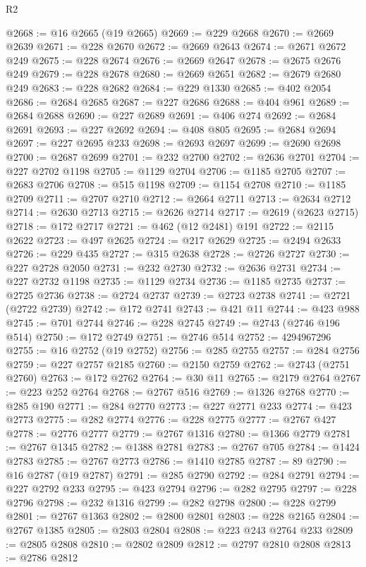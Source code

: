 \begin{lexlean}{R2}
\begin{coremodule}
@2668 := @16 @2665 (@19 @2665)
@2669 := @229 @2668
@2670 := @2669 @2639
@2671 := @228 @2670
@2672 := @2669 @2643
@2674 := @2671 @2672 @249
@2675 := @228 @2674
@2676 := @2669 @2647
@2678 := @2675 @2676 @249
@2679 := @228 @2678
@2680 := @2669 @2651
@2682 := @2679 @2680 @249
@2683 := @228 @2682
@2684 := @229 @1330
@2685 := @402 @2054
@2686 := @2684 @2685
@2687 := @227 @2686
@2688 := @404 @961
@2689 := @2684 @2688
@2690 := @227 @2689
@2691 := @406 @274
@2692 := @2684 @2691
@2693 := @227 @2692
@2694 := @408 @805
@2695 := @2684 @2694
@2697 := @227 @2695 @233
@2698 := @2693 @2697
@2699 := @2690 @2698
@2700 := @2687 @2699
@2701 := @232 @2700
@2702 := @2636 @2701
@2704 := @227 @2702 @1198
@2705 := @1129 @2704
@2706 := @1185 @2705
@2707 := @2683 @2706
@2708 := @515 @1198
@2709 := @1154 @2708
@2710 := @1185 @2709
@2711 := @2707 @2710
@2712 := @2664 @2711
@2713 := @2634 @2712
@2714 := @2630 @2713
@2715 := @2626 @2714
@2717 := @2619 (@2623 @2715)
@2718 := @172 @2717
@2721 := @462 (@12 @2481) @191
@2722 := @2115 @2622
@2723 := @497 @2625
@2724 := @217 @2629
@2725 := @2494 @2633
@2726 := @229 @435
@2727 := @315 @2638
@2728 := @2726 @2727
@2730 := @227 @2728 @2050
@2731 := @232 @2730
@2732 := @2636 @2731
@2734 := @227 @2732 @1198
@2735 := @1129 @2734
@2736 := @1185 @2735
@2737 := @2725 @2736
@2738 := @2724 @2737
@2739 := @2723 @2738
@2741 := @2721 (@2722 @2739)
@2742 := @172 @2741
@2743 := @421 @11
@2744 := @423 @988
@2745 := @701 @2744
@2746 := @228 @2745
@2749 := @2743 (@2746 @196 @514)
@2750 := @172 @2749
@2751 := @2746 @514
@2752 := 4294967296
@2755 := @16 @2752 (@19 @2752)
@2756 := @285 @2755
@2757 := @284 @2756
@2759 := @227 @2757 @2185
@2760 := @2150 @2759
@2762 := @2743 (@2751 @2760)
@2763 := @172 @2762
@2764 := @30 @11
@2765 := @2179 @2764
@2767 := @223 @252 @2764
@2768 := @2767 @516
@2769 := @1326 @2768
@2770 := @285 @190
@2771 := @284 @2770
@2773 := @227 @2771 @233
@2774 := @423 @2773
@2775 := @282 @2774
@2776 := @228 @2775
@2777 := @2767 @427
@2778 := @2776 @2777
@2779 := @2767 @1316
@2780 := @1366 @2779
@2781 := @2767 @1345
@2782 := @1388 @2781
@2783 := @2767 @705
@2784 := @1424 @2783
@2785 := @2767 @2773
@2786 := @1410 @2785
@2787 := 89
@2790 := @16 @2787 (@19 @2787)
@2791 := @285 @2790
@2792 := @284 @2791
@2794 := @227 @2792 @233
@2795 := @423 @2794
@2796 := @282 @2795
@2797 := @228 @2796
@2798 := @232 @1316
@2799 := @282 @2798
@2800 := @228 @2799
@2801 := @2767 @1363
@2802 := @2800 @2801
@2803 := @228 @2165
@2804 := @2767 @1385
@2805 := @2803 @2804
@2808 := @223 @243 @2764 @233
@2809 := @2805 @2808
@2810 := @2802 @2809
@2812 := @2797 @2810 @2808
@2813 := @2786 @2812

\end{coremodule}
\end{lexlean}

